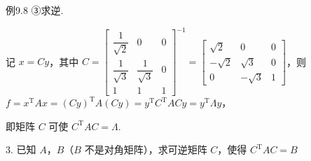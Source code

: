 \begin{fcard}{例9.8}
③求逆.

记 $x=Cy$，其中 $C=\begin{bmatrix}\dfrac{1}{\sqrt2}&0&0\\[8pt]\dfrac{1}{\sqrt3}&\dfrac{1}{\sqrt3}&0\\[8pt]1&1&1\end{bmatrix}^{-1}=\begin{bmatrix}\sqrt2&0&0\\-\sqrt2&\sqrt3&0\\0&-\sqrt3&1\end{bmatrix}$，则 $f=x^{\mathrm T}Ax=(Cy)^{\mathrm T}A(Cy)=y^{\mathrm T}C^{\mathrm T}ACy=y^{\mathrm T}\Lambda y$，

即矩阵 $C$ 可使 $C^{\mathrm T}AC=\Lambda$.
\end{fcard}

3. 已知 $A$，$B$（$B$ 不是对角矩阵），求可逆矩阵 $C$，使得 $C^{\mathrm T}AC=B$

